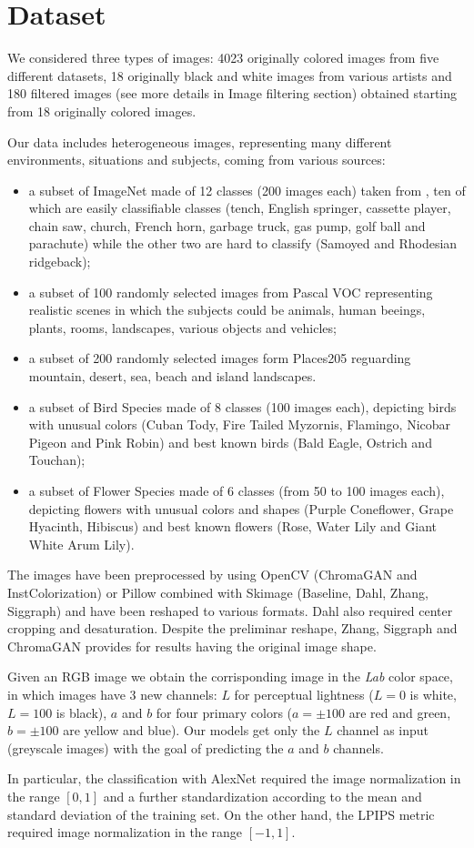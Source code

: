 \section{Dataset}
We considered three types of images: 4023 originally colored images from five different datasets, 18 originally black and white images from various artists and 180 filtered images (see more details in Image filtering section) obtained starting from 18 originally colored images.

Our data includes heterogeneous images, representing many different environments, situations and subjects, coming from various sources:
\begin{itemize}
	\item a subset of ImageNet made of 12 classes (200 images each) taken from \cite{imagenette}, ten of which are easily classifiable classes (tench, English springer, cassette player, chain saw, church, French horn, garbage truck, gas pump, golf ball and parachute) while the other two are hard to classify (Samoyed and Rhodesian ridgeback);
	\item a subset of 100 randomly selected images from Pascal VOC \cite{pascal} representing realistic scenes in which the subjects could be animals, human beeings, plants, rooms, landscapes, various objects and vehicles;
	\item a subset of 200 randomly selected images form Places205 \cite{place} reguarding mountain, desert, sea, beach and island landscapes.
	\item a subset of Bird Species \cite{bird} made of 8 classes (100 images each), depicting birds with unusual colors (Cuban Tody, Fire Tailed Myzornis, Flamingo, Nicobar Pigeon and Pink Robin) and best known birds (Bald Eagle, Ostrich and Touchan);
	\item a subset of Flower Species \cite{flower} made of 6 classes (from 50 to 100 images each), depicting flowers with unusual colors and shapes (Purple Coneflower, Grape Hyacinth, Hibiscus) and best known flowers (Rose, Water Lily and Giant White Arum Lily).
\end{itemize}

The images have been preprocessed by using OpenCV (ChromaGAN and InstColorization) or Pillow combined with Skimage
(Baseline, Dahl, Zhang, Siggraph) and have been reshaped to various formats. Dahl also required center cropping and desaturation. Despite the preliminar reshape, Zhang, Siggraph and ChromaGAN provides for results having the original image shape.

Given an RGB image
we obtain the corrisponding image in the \textit{Lab} color space, in which images have 3 new
channels: $L$ for perceptual lightness ($L=0$ is white, $L=100$ is black), $a$ and $b$ for
four primary colors ($a=\pm100$ are red and green, $b=\pm100$ are yellow and blue). Our models get only the $L$ channel as input (greyscale images) with the goal of predicting the $a$ and $b$
channels.

In particular, the classification with AlexNet required the image normalization in the
range $[0,1]$ and a further standardization according to the mean and standard deviation of the
training set. On the other hand, the LPIPS metric required image normalization in the range $[-1,1]$.